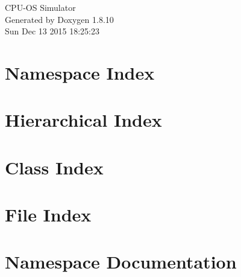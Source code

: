 \documentclass[twoside]{book}
\newcommand{\+}{\discretionary{\mbox{\scriptsize$\hookleftarrow$}}{}{}}
\newcommand{\clearemptydoublepage}{%
  \newpage{\pagestyle{empty}\cleardoublepage}%
}
\begin{document}
\hypersetup{pageanchor=false,
             bookmarks=true,
             bookmarksnumbered=true,
             pdfencoding=unicode
            }
\begin{titlepage}
\vspace*{7cm}
\begin{center}%
{\Large C\+P\+U-\/\+O\+S Simulator }\\
\vspace*{1cm}
{\large Generated by Doxygen 1.8.10}\\
\vspace*{0.5cm}
{\small Sun Dec 13 2015 18:25:23}\\
\end{center}
\end{titlepage}
\clearemptydoublepage
\tableofcontents
\clearemptydoublepage
{}
\hypersetup{pageanchor=true}

\chapter{Namespace Index}

\chapter{Hierarchical Index}

\chapter{Class Index}

\chapter{File Index}

\chapter{Namespace Documentation}










\end{document}
